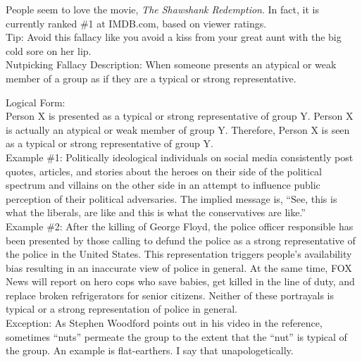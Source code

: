 \documentclass[a4paper,12pt,single,pdftex]{scrbook}
\begin{document}
    
      People seem to love the movie, {\it The Shawshank Redemption}.  In fact, it is currently ranked \#1 at IMDB.com, based on viewer ratings.
    \\

    
      Tip: Avoid this fallacy like you avoid a kiss from your great aunt with the big cold sore on her lip.
    \\

  

Nutpicking Fallacy
    Description: When someone presents an atypical or weak member of a group as if they are a typical or strong representative.

    
      Logical Form:
    \\

    
      Person X is presented as a typical or strong representative of group Y. \newline
Person X is actually an atypical or weak member of group Y. \newline
Therefore, Person X is seen as a typical or strong representative of group Y.
    \\

    
      Example \#1: Politically ideological individuals on social media consistently post quotes, articles, and stories about the heroes on their side of the political spectrum and villains on the other side in an attempt to influence public perception of their political adversaries. The implied message is, “See, this is what the liberals, are like and this is what the conservatives are like.”
    \\

    
      Example \#2: After the killing of George Floyd, the police officer responsible has been presented by those calling to defund the police as a strong representative of the police in the United States. This representation triggers people’s availability bias resulting in an inaccurate view of police in general. At the same time, FOX News will report on hero cops who save babies, get killed in the line of duty, and replace broken refrigerators for senior citizens. Neither of these portrayals is typical or a strong representation of police in general.
    \\

    
      Exception: As Stephen Woodford points out in his video in the reference, sometimes “nuts” permeate the group to the extent that the “nut” is typical of the group. An example is flat-earthers. I say that unapologetically.
    \\
\end{document}
